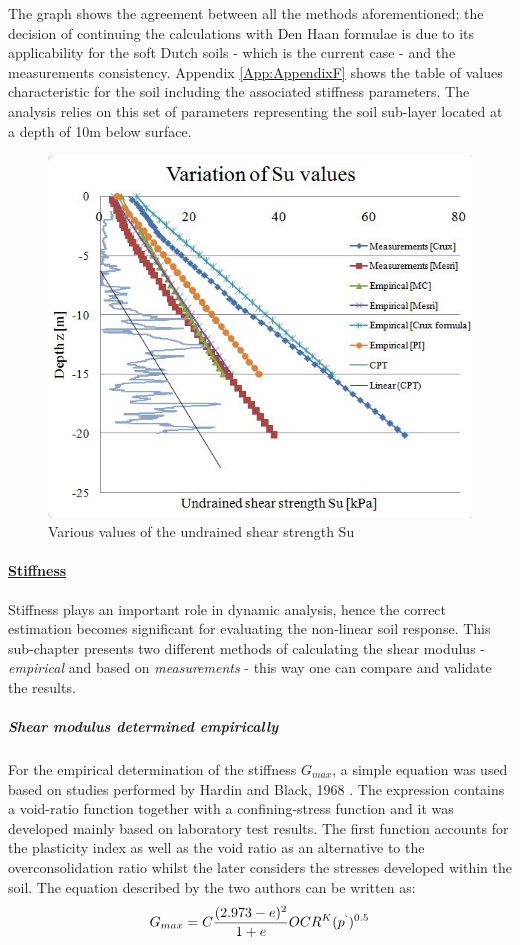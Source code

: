 \documentclass[12pt,a4paper]{report}
\begin{document}
The graph shows the agreement between all the methods aforementioned; the decision of continuing the calculations with Den Haan \cite{den2011ongedraineerde} formulae is due to its applicability for the soft Dutch soils - which is the current case - and the measurements consistency. Appendix \ref{App:AppendixF} shows the table of values characteristic for the soil including the associated stiffness parameters. The analysis relies on this set of parameters representing the soil sub-layer located at a depth of 10m below surface.

\begin{figure}[h!]
	\centering
	\includegraphics[width=0.7\linewidth]{"Su"}
	\caption{Various values of the undrained shear strength Su}
	\label{Su}
\end{figure}

\paragraph{\underline{Stiffness}}
Stiffness plays an important role in dynamic analysis, hence the correct estimation becomes significant for evaluating the non-linear soil response. This sub-chapter presents two different methods of calculating the shear modulus - \textit{empirical} and based on \textit{measurements} - this way one can compare and validate the results.

\subparagraph{Shear modulus determined empirically}
For the empirical determination of the stiffness $G_{max}$, a simple equation was used based on studies performed by Hardin and Black, 1968 \cite{hardin1972shear}. The expression contains a void-ratio function together with a confining-stress function and it was developed mainly based on laboratory test results. The first function accounts for the plasticity index as well as the void ratio as an alternative to the overconsolidation ratio whilst the later considers the stresses developed within the soil. The equation described by the two authors can be written as:
\begin{equation}
	G_{max}=C \frac{(2.973-e)^2}{1+e}OCR^K(p^`)^{0.5}
\end{equation}
\end{document}
